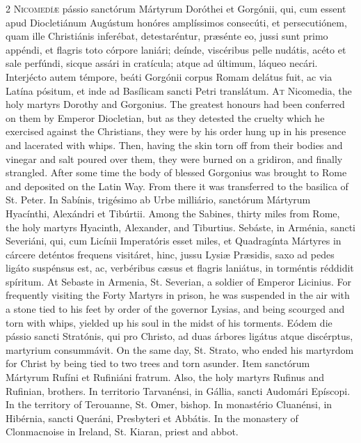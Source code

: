 \begin{paracol}{2}
\lettrine[lines=2]{N}{icomedíæ} pássio 
 sanctórum Mártyrum Doróthei et Gorgónii, qui, cum essent apud Diocletiánum 
 Augústum honóres amplíssimos consecúti, et persecutiónem, quam ille 
 Christiánis inferébat, detestaréntur, præsénte eo, jussi sunt primo appéndi, 
 et flagris toto córpore laniári; deínde, viscéribus pelle nudátis, acéto et 
 sale perfúndi, sicque assári in cratícula; atque ad últimum, láqueo necári. 
 Interjécto autem témpore, beáti Gorgónii corpus Romam delátus fuit, ac via 
 Latína pósitum, et inde ad Basílicam sancti Petri translátum.
\switchcolumn
{}
\lettrine[lines=2]{A}{t} Nicomedia, the holy martyrs 
 Dorothy and Gorgonius. The greatest honours had been conferred on them 
 by Emperor Diocletian, but as they detested the cruelty which he exercised 
 against the Christians, they were by his order hung up in his presence and 
 lacerated with whips. Then, having the skin torn off from their bodies 
 and vinegar and salt poured over them, they were burned on a gridiron, and 
 finally strangled. After some time the body of blessed Gorgonius was 
 brought to Rome and deposited on the Latin Way. From there it was 
 transferred to the basilica of St. Peter.
\switchcolumn*
{}
In Sabínis, trigésimo 
 ab Urbe milliário, sanctórum Mártyrum Hyacínthi, Alexándri et Tibúrtii.
\switchcolumn
{}
Among the Sabines, thirty miles from 
 Rome, the holy martyrs Hyacinth, Alexander, and Tiburtius.
\switchcolumn*
{}
Sebáste, in Arménia, sancti Severiáni, qui, cum Licínii Imperatóris esset miles, et Quadragínta 
 Mártyres in cárcere deténtos frequens visitáret, hinc, jussu Lysiæ Præsidis, 
 saxo ad pedes ligáto suspénsus est, ac, verbéribus cæsus et flagris laniátus, 
 in torméntis réddidit spíritum.
\switchcolumn
{}
At Sebaste in Armenia, St. Severian, 
 a soldier of Emperor Licinius. For frequently visiting the Forty 
 Martyrs in prison, he was suspended in the air with a stone tied to his feet 
 by order of the governor Lysias, and being scourged and torn with whips, 
 yielded up his soul in the midst of his torments.
\switchcolumn*
{}
Eódem die pássio sancti 
 Stratónis, qui pro Christo, ad duas árbores ligátus atque discérptus, 
 martyrium consummávit.
\switchcolumn
{}
On the same day, St. Strato, who 
 ended his martyrdom for Christ by being tied to two trees and torn asunder.
\switchcolumn*
{}
Item sanctórum Mártyrum 
 Rufíni et Rufiniáni fratrum.
\switchcolumn
{}
Also, the holy martyrs Rufinus and 
 Rufinian, brothers.
\switchcolumn*
{}
In territorio 
 Tarvanénsi, in Gállia, sancti Audomári Epíscopi.
\switchcolumn
{}
In the territory of Terouanne, St. 
 Omer, bishop.
\switchcolumn*
{}
In monastério Cluanénsi, 
 in Hibérnia, sancti Queráni, Presbyteri et Abbátis.
\switchcolumn
{}
In the monastery of Clonmacnoise in 
 Ireland, St. Kiaran, priest and abbot.
\switchcolumn*
{}
\end{paracol}


